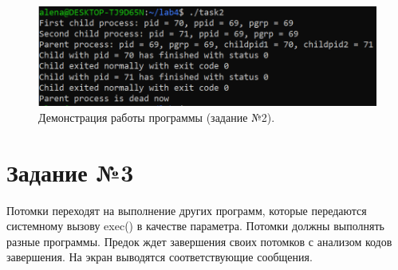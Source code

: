 \documentclass[12pt]{report}
\begin{document}
\begin{figure}[H]

	\centering

	\includegraphics[width=\linewidth]{img/task02.png}
	\caption{Демонстрация работы программы (задание №2).}

	\label{fig:task02}

\end{figure}

\section*{Задание №3}

Потомки переходят на выполнение других программ, которые передаются системному вызову exec() в качестве параметра. Потомки должны выполнять разные программы. Предок ждет завершения своих потомков с анализом кодов завершения. На экран выводятся соответствующие сообщения.
\end{document}
